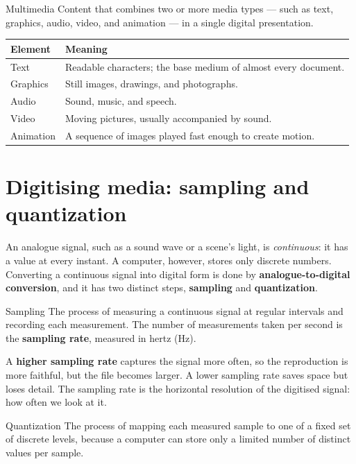 \begin{definitionbox}{Multimedia}
Content that combines two or more media types --- such as text, graphics,
audio, video, and animation --- in a single digital presentation.
\end{definitionbox}

\begin{center}
\begin{tabular}{p{}p{}}
\toprule
\textbf{Element} & \textbf{Meaning} \\
\midrule
Text & Readable characters; the base medium of almost every document. \\
Graphics & Still images, drawings, and photographs. \\
Audio & Sound, music, and speech. \\
Video & Moving pictures, usually accompanied by sound. \\
Animation & A sequence of images played fast enough to create motion. \\
\bottomrule
\end{tabular}
\end{center}

\section{Digitising media: sampling and quantization}
An analogue signal, such as a sound wave or a scene's light, is
\emph{continuous}: it has a value at every instant. A computer, however,
stores only discrete numbers. Converting a continuous signal into digital
form is done by \textbf{analogue-to-digital conversion}, and it has two
distinct steps, \textbf{sampling} and \textbf{quantization}.

\begin{definitionbox}{Sampling}
The process of measuring a continuous signal at regular intervals and
recording each measurement. The number of measurements taken per second is
the \textbf{sampling rate}, measured in hertz (Hz).
\end{definitionbox}

A \textbf{higher sampling rate} captures the signal more often, so the
reproduction is more faithful, but the file becomes larger. A lower sampling
rate saves space but loses detail. The sampling rate is the horizontal
resolution of the digitised signal: how often we look at it.

\begin{definitionbox}{Quantization}
The process of mapping each measured sample to one of a fixed set of discrete
levels, because a computer can store only a limited number of distinct values
per sample.
\end{definitionbox}

